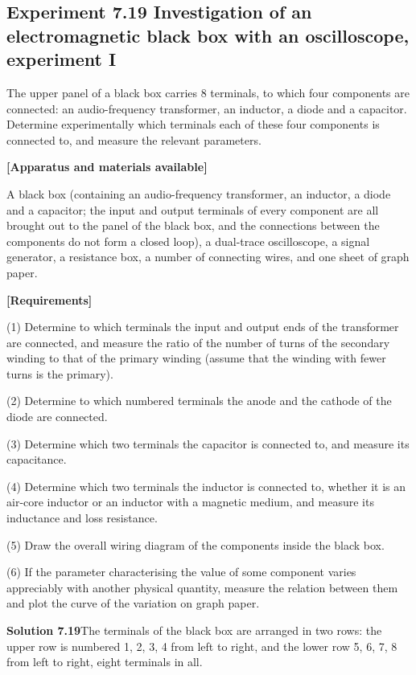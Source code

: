 \subsection*{Experiment 7.19 \quad Investigation of an electromagnetic black box with an oscilloscope, experiment I}

The upper panel of a black box carries 8 terminals, to which four components are connected: an audio-frequency transformer, an inductor, a diode and a capacitor. Determine experimentally which terminals each of these four components is connected to, and measure the relevant parameters.

\textbf{[Apparatus and materials available]}

A black box (containing an audio-frequency transformer, an inductor, a diode and a capacitor; the input and output terminals of every component are all brought out to the panel of the black box, and the connections between the components do not form a closed loop), a dual-trace oscilloscope, a signal generator, a resistance box, a number of connecting wires, and one sheet of graph paper.

\textbf{[Requirements]}

(1) Determine to which terminals the input and output ends of the transformer are connected, and measure the ratio of the number of turns of the secondary winding to that of the primary winding (assume that the winding with fewer turns is the primary).

(2) Determine to which numbered terminals the anode and the cathode of the diode are connected.

(3) Determine which two terminals the capacitor is connected to, and measure its capacitance.

(4) Determine which two terminals the inductor is connected to, whether it is an air-core inductor or an inductor with a magnetic medium, and measure its inductance and loss resistance.

(5) Draw the overall wiring diagram of the components inside the black box.

(6) If the parameter characterising the value of some component varies appreciably with another physical quantity, measure the relation between them and plot the curve of the variation on graph paper.

\textbf{Solution 7.19}\quad The terminals of the black box are arranged in two rows: the upper row is numbered 1, 2, 3, 4 from left to right, and the lower row 5, 6, 7, 8 from left to right, eight terminals in all.

